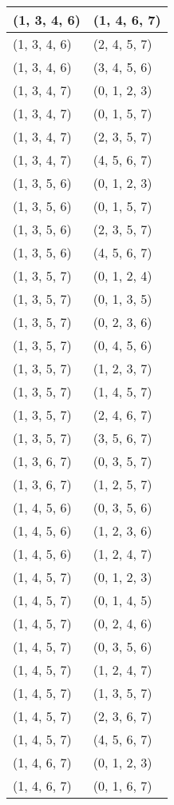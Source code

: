 \begin{footnotesize}
\begin{longtable}[c]{|l|l|}
(1, 3, 4, 6)
&(1, 4, 6, 7)
\\ \hline
(1, 3, 4, 6)
&(2, 4, 5, 7)
\\ \hline
(1, 3, 4, 6)
&(3, 4, 5, 6)
\\ \hline
(1, 3, 4, 7)
&(0, 1, 2, 3)
\\ \hline
(1, 3, 4, 7)
&(0, 1, 5, 7)
\\ \hline
(1, 3, 4, 7)
&(2, 3, 5, 7)
\\ \hline
(1, 3, 4, 7)
&(4, 5, 6, 7)
\\ \hline
(1, 3, 5, 6)
&(0, 1, 2, 3)
\\ \hline
(1, 3, 5, 6)
&(0, 1, 5, 7)
\\ \hline
(1, 3, 5, 6)
&(2, 3, 5, 7)
\\ \hline
(1, 3, 5, 6)
&(4, 5, 6, 7)
\\ \hline
(1, 3, 5, 7)
&(0, 1, 2, 4)
\\ \hline
(1, 3, 5, 7)
&(0, 1, 3, 5)
\\ \hline
(1, 3, 5, 7)
&(0, 2, 3, 6)
\\ \hline
(1, 3, 5, 7)
&(0, 4, 5, 6)
\\ \hline
(1, 3, 5, 7)
&(1, 2, 3, 7)
\\ \hline
(1, 3, 5, 7)
&(1, 4, 5, 7)
\\ \hline
(1, 3, 5, 7)
&(2, 4, 6, 7)
\\ \hline
(1, 3, 5, 7)
&(3, 5, 6, 7)
\\ \hline
(1, 3, 6, 7)
&(0, 3, 5, 7)
\\ \hline
(1, 3, 6, 7)
&(1, 2, 5, 7)
\\ \hline
(1, 4, 5, 6)
&(0, 3, 5, 6)
\\ \hline
(1, 4, 5, 6)
&(1, 2, 3, 6)
\\ \hline
(1, 4, 5, 6)
&(1, 2, 4, 7)
\\ \hline
(1, 4, 5, 7)
&(0, 1, 2, 3)
\\ \hline
(1, 4, 5, 7)
&(0, 1, 4, 5)
\\ \hline
(1, 4, 5, 7)
&(0, 2, 4, 6)
\\ \hline
(1, 4, 5, 7)
&(0, 3, 5, 6)
\\ \hline
(1, 4, 5, 7)
&(1, 2, 4, 7)
\\ \hline
(1, 4, 5, 7)
&(1, 3, 5, 7)
\\ \hline
(1, 4, 5, 7)
&(2, 3, 6, 7)
\\ \hline
(1, 4, 5, 7)
&(4, 5, 6, 7)
\\ \hline
(1, 4, 6, 7)
&(0, 1, 2, 3)
\\ \hline
(1, 4, 6, 7)
&(0, 1, 6, 7)
\\ \hline

\end{longtable}
\end{footnotesize}

